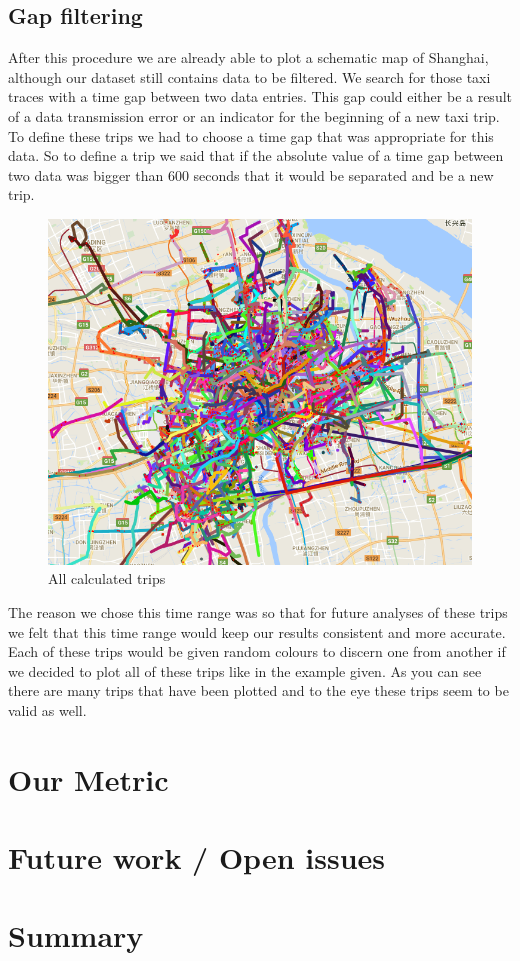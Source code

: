 \documentclass[11pt,conference,a4paper,twocolumns,romanappendices]{IEEEtran}
\begin{document}
\subsection{Gap filtering}
After this procedure we are already able to plot a schematic map of Shanghai, although our dataset still contains data to be filtered. We search for those taxi traces with a time gap between two data entries. This gap could either be a result of a data transmission error or an indicator for the beginning of a new taxi trip.\\
To define these trips we had to choose a time gap that was appropriate for this data. So to define a trip we said that if the absolute value of a time gap between two data was bigger than 600 seconds that it would be separated and be a new trip.\\
\begin{figure}[h]
\centering
\includegraphics[scale=0.35]{plotalltrips.png}
\caption{\label{fig:plotalltrips}All calculated trips}
\end{figure}
The reason we chose this time range was so that for future analyses of these trips we felt that this time range would keep our results consistent and more accurate. Each of these trips would be given random colours to discern one from another if we decided to plot all of these trips like in the example given. As you can see there are many trips that have been plotted and to the eye these trips seem to be valid as well. \\
\section{Our Metric}
\section{Future work / Open issues}
\section{Summary}

\newpage


\end{document}
